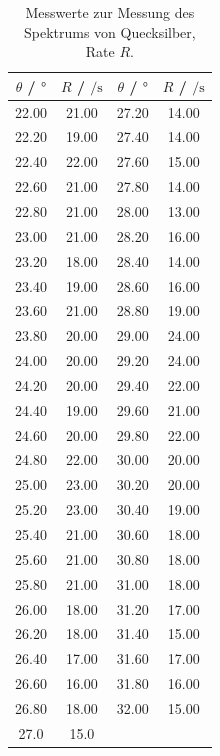 \begin{table}
  \centering
  \caption{Messwerte zur Messung des Spektrums von Quecksilber, Rate $R$.}
  \label{tab:quecksilber}
  \begin{tabular}{c c | c c }
    \toprule
    $\theta$ / $\si{\degree}$ & $R$ / $\si{\per\second}$ & $\theta$ / $\si{\degree}$ & $R$ / $\si{\per\second}$ \\
    \midrule
    22.00 & 21.00 & 27.20 & 14.00 \\
    22.20 & 19.00 & 27.40 & 14.00 \\
    22.40 & 22.00 & 27.60 & 15.00 \\
    22.60 & 21.00 & 27.80 & 14.00 \\
    22.80 & 21.00 & 28.00 & 13.00 \\
    23.00 & 21.00 & 28.20 & 16.00 \\
    23.20 & 18.00 & 28.40 & 14.00 \\
    23.40 & 19.00 & 28.60 & 16.00 \\
    23.60 & 21.00 & 28.80 & 19.00 \\
    23.80 & 20.00 & 29.00 & 24.00 \\
    24.00 & 20.00 & 29.20 & 24.00 \\
    24.20 & 20.00 & 29.40 & 22.00 \\
    24.40 & 19.00 & 29.60 & 21.00 \\
    24.60 & 20.00 & 29.80 & 22.00 \\
    24.80 & 22.00 & 30.00 & 20.00 \\
    25.00 & 23.00 & 30.20 & 20.00 \\
    25.20 & 23.00 & 30.40 & 19.00 \\
    25.40 & 21.00 & 30.60 & 18.00 \\
    25.60 & 21.00 & 30.80 & 18.00 \\
    25.80 & 21.00 & 31.00 & 18.00 \\
    26.00 & 18.00 & 31.20 & 17.00 \\
    26.20 & 18.00 & 31.40 & 15.00 \\
    26.40 & 17.00 & 31.60 & 17.00 \\
    26.60 & 16.00 & 31.80 & 16.00 \\
    26.80 & 18.00 & 32.00 & 15.00 \\
    27.0 &	15.0 & & \\
    \bottomrule
  \end{tabular} %
\end{table}
